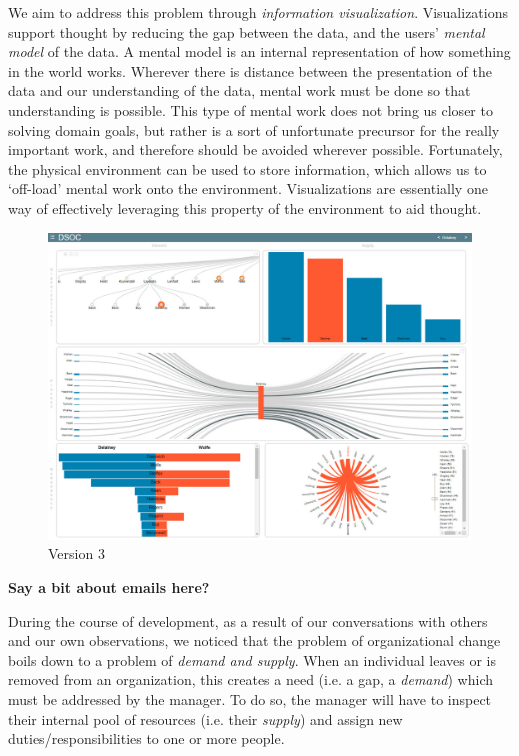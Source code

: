 \documentclass[journal]{vgtc}                %
\begin{document}
We aim to address this problem through \emph{information visualization}. Visualizations support thought by reducing the gap between the data, and the users' \emph{mental model} of the data\cite{yi2007toward}. A mental model is an internal representation of how something in the world works\cite{staggersmodel,norman2014some}. Wherever there is distance between the presentation of the data and our understanding of the data, mental work must be done so that understanding is possible. This type of mental work does not bring us closer to solving domain goals, but rather is a sort of unfortunate precursor for the really important work, and therefore should be avoided wherever possible\cite{paas2003cognitive}. Fortunately, the physical environment can be used to store information, which allows us to \lq off-load\rq{} mental work onto the environment\cite{wilson2002six}. Visualizations are essentially one way of effectively leveraging this property of the environment to aid thought.
\begin{figure}
  \centering
  \includegraphics[width=\columnwidth]{pictures/version3.jpg}
  \caption{Version 3}
  \label{fig:global}
\end{figure}


\textbf{{\color{Plum}Say a bit about emails here?}}

During the course of development, as a result of our conversations with others and our own observations, we noticed that the problem of organizational change boils down to a problem of \emph{demand and supply}. When an individual leaves or is removed from an organization, this creates a need (i.e. a gap, a \emph{demand}) which must be addressed by the manager. To do so, the manager will have to inspect their internal pool of resources (i.e. their \emph{supply}) and assign new duties/responsibilities to one or more people.
\end{document}
